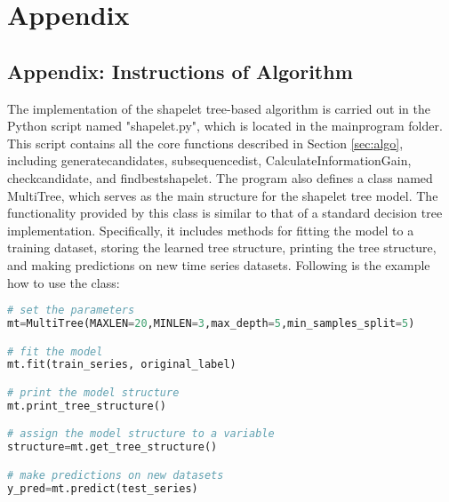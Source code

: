 \appendix
\chapter{Appendix}
\section{Appendix: Instructions of Algorithm}\label{app:A}
The implementation of the shapelet tree-based algorithm is carried out in the Python script named "shapelet.py", which is located in the main\textunderscore program folder. This script contains all the core functions described in Section \ref{sec:algo}, including generate\textunderscore candidates, subsequence\textunderscore dist, CalculateInformationGain, check\textunderscore candidate, and find\textunderscore best\textunderscore shapelet. The program also defines a class named MultiTree, which serves as the main structure for the shapelet tree model. The functionality provided by this class is similar to that of a standard decision tree implementation. Specifically, it includes methods for fitting the model to a training dataset, storing the learned tree structure, printing the tree structure, and making predictions on new time series datasets. Following is the example how to use the class:\\
\begin{lstlisting}[language=Python, caption=Example of using the shapelet tree-based algorithm]
# set the parameters
mt=MultiTree(MAXLEN=20,MINLEN=3,max_depth=5,min_samples_split=5) 

# fit the model
mt.fit(train_series, original_label) 

# print the model structure	
mt.print_tree_structure() 

# assign the model structure to a variable	
structure=mt.get_tree_structure() 

# make predictions on new datasets	
y_pred=mt.predict(test_series) 
\end{lstlisting}
